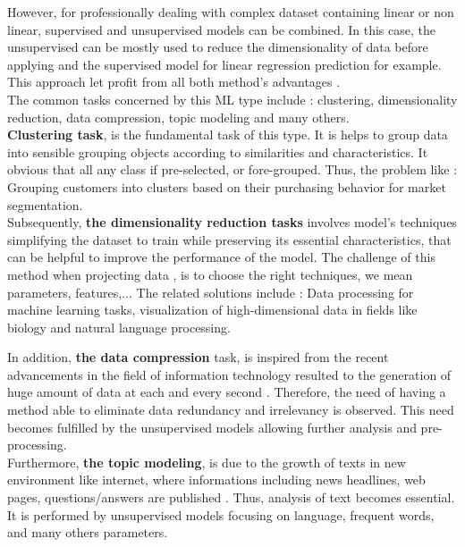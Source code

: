 \documentclass[12pt,a4paper, oneside]{book}
\begin{document}
However, for professionally dealing with complex dataset containing linear or non linear, supervised and unsupervised models can be combined. In this case, the unsupervised can be mostly used to reduce the dimensionality of data before applying and the supervised model for linear regression prediction for example. This approach let profit from all both method's advantages \cite{liu2000interactive}.\\ 

The common tasks concerned by this ML type include : clustering, dimensionality reduction, data compression, topic modeling and many others. \\

\textbf{Clustering task}, is the fundamental task of this type. It is helps to group data into sensible grouping objects according to similarities and  characteristics. It obvious that all any class if pre-selected, or fore-grouped. Thus, the problem like : Grouping customers into clusters based on their purchasing behavior for market segmentation.\\

Subsequently, \textbf{the dimensionality reduction tasks} involves  model's techniques simplifying  the dataset to train while preserving its essential characteristics, that can be helpful to improve the performance of the model. The challenge of this method when projecting data \cite{sorzano2014survey}, is to choose the right techniques, we mean parameters, features,...  The related solutions include : Data processing for machine learning tasks, visualization of high-dimensional data in fields like biology and natural language processing. 

In addition, \textbf{the data compression} task, is inspired from the recent advancements in the field of information technology resulted to the generation of huge amount of data at each and every second \cite{jayasankar2021survey} . Therefore, the need of having a method able to eliminate data redundancy and irrelevancy is observed. This need becomes fulfilled by the unsupervised models allowing further analysis and pre-processing.\\

Furthermore, \textbf{the topic modeling}, is due to the growth of texts in new environment like internet, where informations including news headlines, web pages, questions/answers are published \cite{qiang2020short}. Thus, analysis of text becomes essential. It is performed by unsupervised models focusing on language, frequent words, and many others parameters.\\
\end{document}
